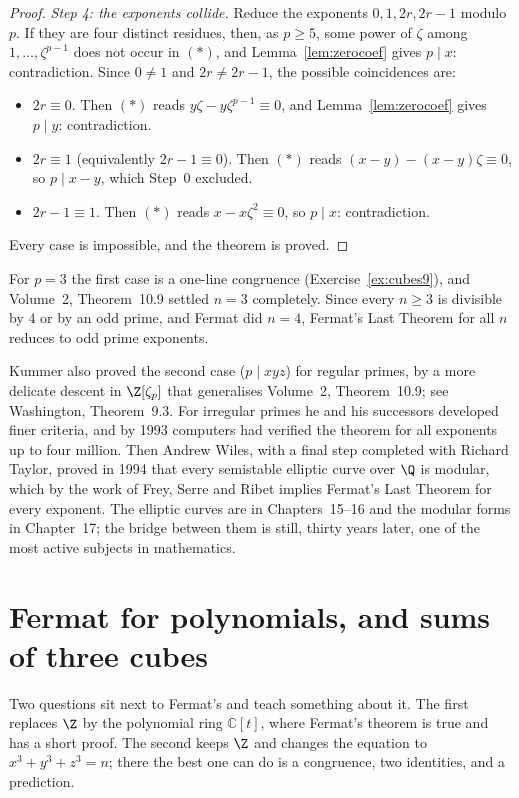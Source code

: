 \begin{proof}
\emph{Step 4: the exponents collide.} Reduce the exponents $0,1,2r,2r-1$ modulo $p$. If they are four distinct residues,
then, as $p\ge5$, some power of $\zeta$ among $1,\dots,\zeta^{p-1}$ does not occur in $(*)$, and Lemma~\ref{lem:zerocoef} gives
$p\mid x$: contradiction. Since $0\ne1$ and $2r\ne2r-1$, the possible coincidences are:
\begin{itemize}
\item $2r\equiv0$. Then $(*)$ reads $y\zeta-y\zeta^{p-1}\equiv0$, and Lemma~\ref{lem:zerocoef} gives $p\mid y$: contradiction.
\item $2r\equiv1$ (equivalently $2r-1\equiv0$). Then $(*)$ reads $(x-y)-(x-y)\zeta\equiv0$, so $p\mid x-y$, which Step~0 excluded.
\item $2r-1\equiv1$. Then $(*)$ reads $x-x\zeta^2\equiv0$, so $p\mid x$: contradiction.
\end{itemize}
Every case is impossible, and the theorem is proved.
\end{proof}

For $p=3$ the first case is a one-line congruence (Exercise~\ref{ex:cubes9}), and Volume~2, Theorem~10.9 settled $n=3$
completely. Since every $n\ge3$ is divisible by $4$ or by an odd prime, and Fermat did $n=4$, Fermat's Last Theorem for all
$n$ reduces to odd prime exponents.

\begin{remark}
Kummer also proved the second case ($p\mid xyz$) for regular primes, by a more delicate descent in $\Z[\zeta_p]$ that
generalises Volume~2, Theorem~10.9; see Washington, Theorem~9.3. For irregular primes he and his successors developed finer
criteria, and by 1993 computers had verified the theorem for all exponents up to four million. Then Andrew Wiles, with a
final step completed with Richard Taylor, proved in 1994 that every semistable elliptic curve over $\Q$ is modular, which by
the work of Frey, Serre and Ribet implies Fermat's Last Theorem for every exponent. The elliptic curves are in
Chapters~15--16 and the modular forms in Chapter~17; the bridge between them is still, thirty years later, one of the most
active subjects in mathematics.
\end{remark}

\section{Fermat for polynomials, and sums of three cubes}

Two questions sit next to Fermat's and teach something about it. The first replaces $\Z$ by the polynomial ring $\mathbb C[t]$,
where Fermat's theorem is true and has a short proof. The second keeps $\Z$ and changes the equation to
$x^3+y^3+z^3=n$; there the best one can do is a congruence, two identities, and a prediction.

